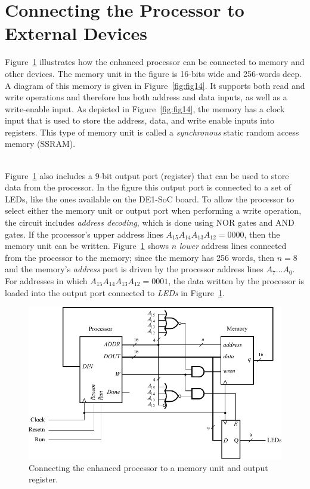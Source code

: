 \documentclass[epsfig,10pt,fullpage]{article}
\begin{document}
\section*{Connecting the Processor to External Devices}

Figure~\ref{fig:fig13} illustrates how the enhanced processor can be connected to memory and 
other devices. The memory unit in the figure is 16-bits wide and 256-words deep.  A diagram 
of this memory is given in Figure~\ref{fig:fig14}.
It supports both read and write operations and therefore has both address and 
data inputs, as well as a write-enable input. As depicted in Figure~\ref{fig:fig14},
the memory has a clock input that is used to store the address, data, and write enable 
inputs into registers.  This type of memory unit is called a {\it synchronous}
static random access memory (SSRAM). 

~\\
Figure~\ref{fig:fig13} also includes a 9-bit output port (register) that can be used to store 
data from the processor. In the figure this output port is connected to a set of LEDs, like 
the ones available on the DE1-SoC board. To allow the processor to select either the memory 
unit or output port when performing a write operation, the circuit includes {\it address decoding},
which is done using NOR gates and AND gates. 
If the processor's upper address lines $A_{15} A_{14} A_{13} A_{12} = 0000$, then the memory unit 
can be written. Figure~\ref{fig:fig13} shows $n$ {\it lower} address lines connected from the 
processor to the memory; since the memory has 256 words, then $n = 8$ and the memory's 
{\it address} port is driven by the processor address lines $A_7 \ldots A_0$. For
addresses in which $A_{15} A_{14} A_{13} A_{12} = 0001$, the data written by the processor
is loaded into the output port connected to {\it LEDs} in Figure~\ref{fig:fig13}.
~\\
\begin{figure}[H]
\begin{center}
\includegraphics{figures/figure13.pdf}
\end{center}
\vspace{-0.5cm}
\caption{Connecting the enhanced processor to a memory unit and output register.}
\label{fig:fig13}
\end{figure}
\end{document}
